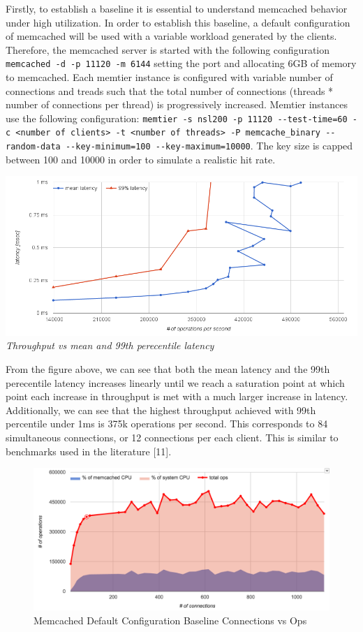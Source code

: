 Firstly, to establish a baseline it is essential to understand memcached
behavior under high utilization. In order to establish this baseline, a
default configuration of memcached will be used with a variable workload
generated by the clients. Therefore, the memcached server is started
with the following configuration
\texttt{memcached\ -d\ -p\ 11120\ -m\ 6144} setting the port and
allocating 6GB of memory to memcached. Each memtier instance is
configured with variable number of connections and treads such that the
total number of connections (threads * number of connections per thread)
is progressively increased. Memtier instances use the following
configuration:
\texttt{memtier\ -s\ nsl200\ -p\ 11120\ -\/-test-time=60\ -c\ \textless{}number\ of\ clients\textgreater{}\ -t\ \textless{}number\ of\ threads\textgreater{}\ -P\ memcache\_binary\ -\/-random-data\ -\/-key-minimum=100\ -\/-key-maximum=10000}.
The key size is capped between 100 and 10000 in order to simulate a
realistic hit rate.

\includegraphics{./res/5_baseline_latency_vs_ops.png} \emph{Throughput
vs mean and 99th perecentile latency}

From the figure above, we can see that both the mean latency and the
99th perecentile latency increases linearly until we reach a saturation
point at which point each increase in throughput is met with a much
larger increase in latency. Additionally, we can see that the highest
throughput achieved with 99th percentile under 1ms is 375k operations
per second. This corresponds to 84 simultaneous connections, or 12
connections per each client. This is similar to benchmarks used in the
literature {[}11{]}.

\begin{figure}[htbp]
\centering
\includegraphics{./res/5_baseline_connections_vs_ops.png}
\caption{Memcached Default Configuration Baseline Connections vs Ops}
\end{figure}

